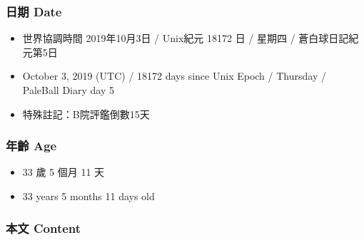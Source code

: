 \documentclass[
]{article}
\providecommand{\tightlist}{%
  \setlength{\itemsep}{0pt}\setlength{\parskip}{0pt}}
\begin{document}
\hypertarget{ux65e5ux671f-date-2}{%
\subsubsection{日期 Date}\label{ux65e5ux671f-date-2}}

\begin{itemize}
\tightlist
\item
  世界協調時間 2019年10月3日 / Unix紀元 18172 日 / 星期四 /
  蒼白球日記紀元第5日
\item
  October 3, 2019 (UTC) / 18172 days since Unix Epoch / Thursday /
  PaleBall Diary day 5
\item
  特殊註記：B院評鑑倒數15天
\end{itemize}

\hypertarget{ux5e74ux9f61-age-2}{%
\subsubsection{年齡 Age}\label{ux5e74ux9f61-age-2}}

\begin{itemize}
\tightlist
\item
  33 歲 5 個月 11 天
\item
  33 years 5 months 11 days old
\end{itemize}

\hypertarget{ux672cux6587-content-2}{%
\subsubsection{本文 Content}\label{ux672cux6587-content-2}}
\end{document}

